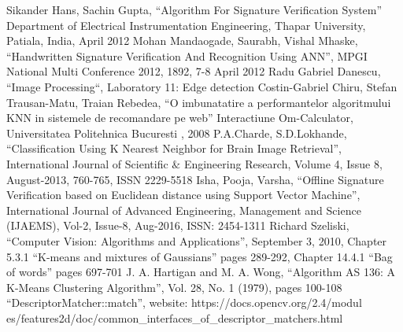 \documentclass[conference]{IEEEtran}
\begin{document}
\begin{thebibliography}{00}
 Sikander Hans, Sachin Gupta, ``Algorithm For Signature Verification System'' Department of Electrical Instrumentation Engineering, Thapar University, Patiala, India, April 2012
 Mohan Mandaogade, Saurabh, Vishal Mhaske, ``Handwritten Signature Verification And Recognition Using ANN'', MPGI National Multi Conference 2012, 1892, 7-8 April 2012
 Radu Gabriel Danescu, ``Image Processing``, Laboratory 11: Edge detection
 Costin-Gabriel Chiru, Stefan Trausan-Matu, Traian Rebedea, ``O imbunatatire a performantelor algoritmului KNN in sistemele de recomandare pe web'' Interactiune Om-Calculator, Universitatea Politehnica Bucuresti , 2008
 P.A.Charde, S.D.Lokhande, ``Classification Using K Nearest Neighbor for Brain
Image Retrieval'', International Journal of Scientific $\&$ Engineering Research, Volume 4, Issue 8, August-2013, 760-765, ISSN 2229-5518
 Isha, Pooja, Varsha, ``Offline Signature Verification based on Euclidean distance using Support Vector Machine'', International Journal of Advanced Engineering, Management and Science (IJAEMS), Vol-2, Issue-8, Aug-2016, ISSN: 2454-1311
 Richard Szeliski, ``Computer Vision: Algorithms and Applications'', September 3, 2010, Chapter 5.3.1 ``K-means and mixtures of Gaussians'' pages 289-292, Chapter 14.4.1 ``Bag of words'' pages 697-701
 J. A. Hartigan and M. A. Wong, ``Algorithm AS 136: A K-Means Clustering Algorithm'', Vol. 28, No. 1 (1979), pages 100-108
 ``DescriptorMatcher::match'', website: https://docs.opencv.org/2.4/modul es/features2d/doc/common\_interfaces\_of\_descriptor\_matchers.html
\end{thebibliography}
\vspace{12pt}
\end{document}
